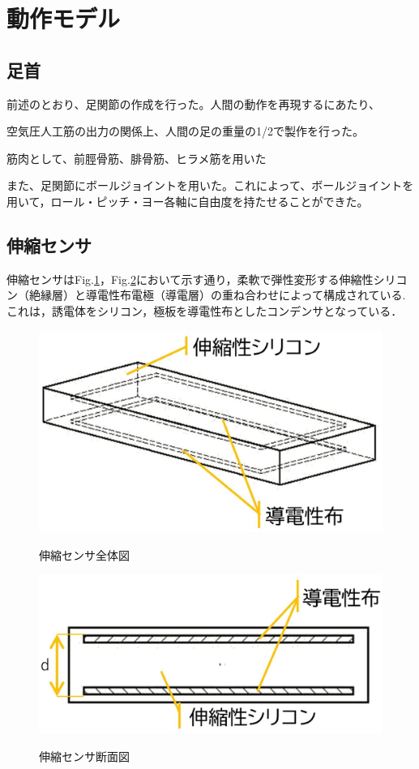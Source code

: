 \section{動作モデル}
\subsection{足首}
前述のとおり、足関節の作成を行った。人間の動作を再現するにあたり、

空気圧人工筋の出力の関係上、人間の足の重量の1/2で製作を行った。

筋肉として、前脛骨筋、腓骨筋、ヒラメ筋を用いた

また、足関節にボールジョイントを用いた。これによって、ボールジョイントを用いて，ロール・ピッチ・ヨー各軸に自由度を持たせることができた。

\subsection{伸縮センサ}
伸縮センサはFig.\ref{伸縮センサ全体図}，Fig.\ref{伸縮センサ断面図}において示す通り，柔軟で弾性変形する伸縮性シリコン（絶縁層）と導電性布電極（導電層）の重ね合わせによって構成されている.
これは，誘電体をシリコン，極板を導電性布としたコンデンサとなっている．

\begin{figure}[h]
    \begin{center}
        \label{伸縮センサ全体図}
        \includegraphics[width=0.5\columnwidth,clip]{Photo/2.実験方法/スライド1.eps}
        \caption{伸縮センサ全体図}
    \end{center}
\end{figure}
\begin{figure}[h]
    \begin{center}       
        \label{伸縮センサ断面図}
        \includegraphics[width=0.5\columnwidth,clip]{Photo/2.実験方法/スライド2.eps}
        \caption{伸縮センサ断面図}
    \end{center}
\end{figure}

